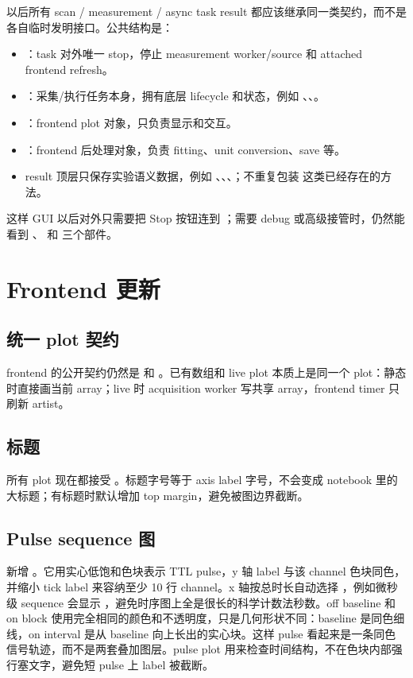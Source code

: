\documentclass[11pt,oneside,openany]{book}
\begin{document}
\begin{notebox}
以后所有 scan / measurement / async task result 都应该继承同一类契约，而不是各自临时发明接口。公共结构是：
\begin{itemize}
  \item {}：task 对外唯一 stop，停止 measurement worker/source 和 attached frontend refresh。
  \item {}：采集/执行任务本身，拥有底层 lifecycle 和状态，例如 、、。
  \item {}：frontend plot 对象，只负责显示和交互。
  \item {}：frontend 后处理对象，负责 fitting、unit conversion、save 等。
  \item result 顶层只保存实验语义数据，例如 、、、；不重复包装  这类已经存在的方法。
\end{itemize}
这样 GUI 以后对外只需要把 Stop 按钮连到 ；需要 debug 或高级接管时，仍然能看到 、 和  三个部件。
\end{notebox}

\chapter{Frontend 更新}
\section{统一 plot 契约}
frontend 的公开契约仍然是  和 。已有数组和 live plot 本质上是同一个 plot：静态时直接画当前 array；live 时 acquisition worker 写共享 array，frontend timer 只刷新 artist。

\section{标题}
所有 plot 现在都接受 。标题字号等于 axis label 字号，不会变成 notebook 里的大标题；有标题时默认增加 top margin，避免被图边界截断。

\section{Pulse sequence 图}
新增 。它用实心低饱和色块表示 TTL pulse，y 轴 label 与该 channel 色块同色，并缩小 tick label 来容纳至少 10 行 channel。x 轴按总时长自动选择 ，例如微秒级 sequence 会显示 ，避免时序图上全是很长的科学计数法秒数。off baseline 和 on block 使用完全相同的颜色和不透明度，只是几何形状不同：baseline 是同色细线，on interval 是从 baseline 向上长出的实心块。这样 pulse 看起来是一条同色信号轨迹，而不是两套叠加图层。pulse plot 用来检查时间结构，不在色块内部强行塞文字，避免短 pulse 上 label 被截断。
\end{document}
